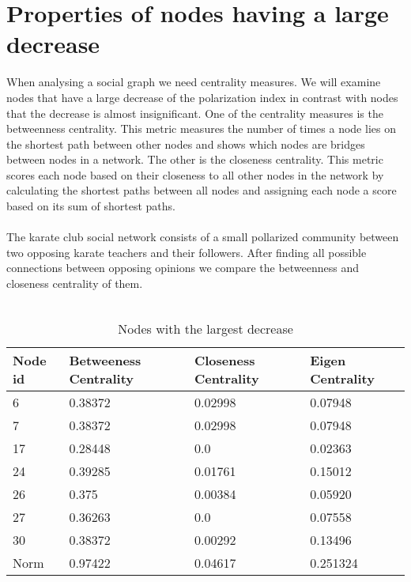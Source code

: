 \section{Properties of nodes having a large decrease}
\label{sec:properties}

When analysing a social graph we need centrality measures. We will examine nodes that have a large decrease of the polarization index in contrast with nodes that the decrease is almost insignificant. One of the centrality measures is the betweenness centrality. This metric measures the number of times a node lies on the shortest path between other nodes and shows which nodes are bridges between nodes in a network. The other is the closeness centrality. This metric scores each node based on their closeness to all other nodes in the network by calculating the shortest paths between all nodes and assigning each node a score based on its sum of shortest paths.
\\
\\
The karate club social network\cite{nr} consists of a small pollarized community between two opposing karate teachers and their followers. After finding all possible connections between opposing opinions we compare the betweenness and closeness centrality of them.
\\
\\

\begin{table}[t]
 \centering
 \caption{Nodes with the largest decrease}
 \label{tab:nodesLargest}
 \begin{tabular}{| l || l | l | l |}
 \hline
  Node id & Betweeness Centrality& Closeness Centrality & Eigen Centrality\\
  \hline
  \hline
  6 & 0.38372 & 0.02998 & 0.07948\\
  \hline
  7 & 0.38372 & 0.02998 & 0.07948\\
  \hline
  17 & 0.28448 & 0.0 &  0.02363\\
  \hline
  24 & 0.39285 & 0.01761 & 0.15012\\
  \hline
  26 & 0.375 & 0.00384 & 0.05920\\
  \hline
  27 & 0.36263 & 0.0 & 0.07558\\ 
  \hline
  30 & 0.38372 & 0.00292 & 0.13496\\ 
  \hline
  \hline
  Norm & 0.97422 & 0.04617 & 0.251324\\ 
  \hline
 \end{tabular}
\end{table}


